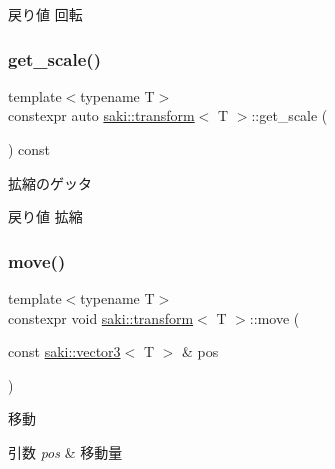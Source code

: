 \begin{DoxyReturn}{戻り値}
回転 
\end{DoxyReturn}
\mbox{\label{classsaki_1_1transform_a8d7e5a36cc869a8b43ee779d90074279}} 
\subsubsection{\texorpdfstring{get\+\_\+scale()}{get\_scale()}}
{\footnotesize\ttfamily template$<$typename T$>$ \\
constexpr auto \mbox{\hyperlink{classsaki_1_1transform}{saki\+::transform}}$<$ T $>$\+::get\+\_\+scale (\begin{DoxyParamCaption}{ }\end{DoxyParamCaption}) const\hspace{0.3cm}{\ttfamily [inline]}}



拡縮のゲッタ 

\begin{DoxyReturn}{戻り値}
拡縮 
\end{DoxyReturn}
\mbox{\label{classsaki_1_1transform_a24a42ef2114b77f0e4520b693d677d60}} 
\subsubsection{\texorpdfstring{move()}{move()}\hspace{0.1cm}{\footnotesize\ttfamily [1/2]}}
{\footnotesize\ttfamily template$<$typename T$>$ \\
constexpr void \mbox{\hyperlink{classsaki_1_1transform}{saki\+::transform}}$<$ T $>$\+::move (\begin{DoxyParamCaption}\item[{const \mbox{\hyperlink{classsaki_1_1vector3}{saki\+::vector3}}$<$ T $>$ \&}]{pos }\end{DoxyParamCaption})\hspace{0.3cm}{\ttfamily [inline]}}



移動 


\begin{DoxyParams}{引数}
{\em pos} & 移動量 \\
\hline
\end{DoxyParams}
\mbox{\label{classsaki_1_1transform_aad46d5a8b608aa9d94fd29a1fe4d5609}} 

